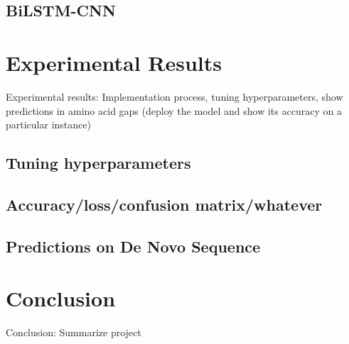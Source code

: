 \documentclass[journal]{IEEEtran}
\begin{document}
  \subsection{BiLSTM-CNN}

\section{Experimental Results}
  Experimental results: Implementation process, tuning hyperparameters,
  show predictions in amino acid gaps
  (deploy the model and show its accuracy on a particular instance)
  \subsection{Tuning hyperparameters}
  \subsection{Accuracy/loss/confusion matrix/whatever}
  \subsection{Predictions on De Novo Sequence}

\section{Conclusion}
  Conclusion: Summarize project




\end{document}
